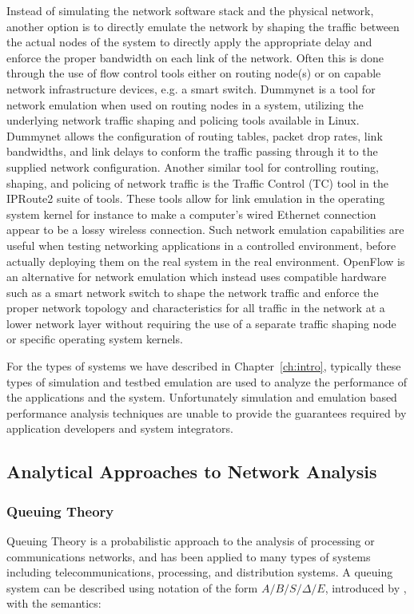 Instead of simulating the network software stack and the physical
network, another option is to directly emulate the network by shaping
the traffic between the actual nodes of the system to directly apply
the appropriate delay and enforce the proper bandwidth on each link of
the network.  Often this is done through the use of flow control tools
either on routing node(s) or on capable network infrastructure
devices, e.g. a smart switch.
Dummynet\cite{dummynet1997}\cite{dummynetRevisited2010} is a tool for
network emulation when used on routing nodes in a system, utilizing
the underlying network traffic shaping and policing tools available in
Linux.  Dummynet allows the configuration of routing tables, packet
drop rates, link bandwidths, and link delays to conform the traffic
passing through it to the supplied network configuration.  Another
similar tool for controlling routing, shaping, and policing of network
traffic is the Traffic Control (TC)\cite{linux_tc} tool in the
IPRoute2\cite{linux_iproute} suite of tools.  These tools allow for
link emulation in the operating system kernel for instance to make a
computer's wired Ethernet connection appear to be a lossy wireless
connection.  Such network emulation capabilities are useful when
testing networking applications in a controlled environment, before
actually deploying them on the real system in the real environment.
OpenFlow\cite{openflow2009openflow} is an alternative for network
emulation which instead uses compatible hardware such as a smart
network switch to shape the network traffic and enforce the proper
network topology and characteristics for all traffic in the network at
a lower network layer without requiring the use of a separate traffic
shaping node or specific operating system kernels.

For the types of systems we have described in Chapter~\ref{ch:intro},
typically these types of simulation and testbed emulation are used to
analyze the performance of the applications and the system.
Unfortunately simulation and emulation based performance analysis
techniques are unable to provide the guarantees required by
application developers and system integrators.

\subsection{Analytical Approaches to Network Analysis}
\label{subsec:related_part1_analytics}

\subsubsection{Queuing Theory}
Queuing Theory\cite{QT_Kendall1953}\cite{QT_Giambene2005} is a
probabilistic approach to the analysis of processing or communications
networks, and has been applied to many types of systems including
telecommunications, processing, and distribution systems.  A queuing
system can be described using notation of the form $A/B/S/\Delta/E$,
introduced by \cite{QT_Kendall1953}, with the semantics:

